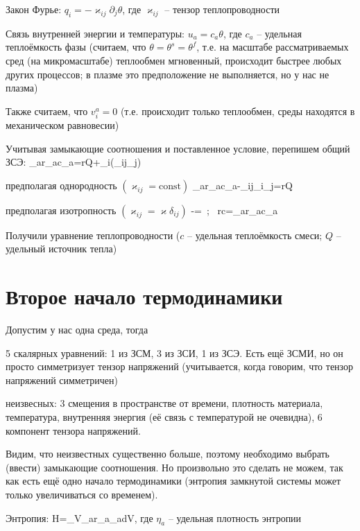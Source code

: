 \documentclass[main.tex]{subfiles}
\begin{document}
Закон Фурье: $q_i=-\varkappa_{ij}\partial_j\theta$, где $\varkappa_{ij}$ -- тензор теплопроводности

Связь внутренней энергии и температуры: $u_a=c_a\theta$, где $c_a$ -- удельная теплоёмкость фазы (считаем, что $\theta=\theta^s=\theta^f$, т.е. на масштабе рассматриваемых сред (на микромасштабе) теплообмен мгновенный, происходит быстрее любых других процессов; в плазме это предположение не выполняется, но у нас не плазма)

Также считаем, что $v_i^a=0$ (т.е. происходит только теплообмен, среды находятся в механическом равновесии)

Учитывая замыкающие соотношения и поставленное условие, перепишем общий ЗСЭ:
\beq\label{HT}
\sum\limits_{a}{r_ac_a}=rQ+\partial_i\left(\varkappa_{ij}\partial_j\theta\right)
\eeq

предполагая однородность $\left(\varkappa_{ij}=\text{const}\right)$
\beq\label{HeatTransfer}
\sum\limits_{a}{r_ac_a}-\varkappa_{ij}\partial_i\partial_j\theta=rQ
\eeq

предполагая изотропность $\left(\varkappa_{ij}=\varkappa\delta_{ij}\right)$
\beq
{}-\Delta\theta=\,\,\,;\,\,\, rc=\sum\limits_{a}{r_ac_a}
\eeq

Получили уравнение теплопроводности ($c$ -- удельная теплоёмкость смеси; $Q$ -- удельный источник тепла)

\newpage
\section{Второе начало термодинамики}

Допустим у нас одна среда, тогда

5 скалярных уравнений: 1 из ЗСМ, 3 из ЗСИ, 1 из ЗСЭ. Есть ещё ЗСМИ, но он просто симметризует тензор напряжений (учитывается, когда говорим, что тензор напряжений симметричен)

неизвесных: 3 смещения в пространстве от времени, плотность материала, температура, внутренняя энергия (её связь с температурой не очевидна), 6 компонент тензора напряжений.

Видим, что неизвестных существенно больше, поэтому необходимо выбрать (ввести) замыкающие соотношения. Но произвольно это сделать не можем, так как есть ещё одно начало термодинамики (энтропия замкнутой системы может только увеличиваться со временем).

Энтропия:
\beq
H=\iiint\limits_{V}{\sum\limits_{a}{r_a\eta_a}dV},
\eeq
где $\eta_a$ -- удельная плотность энтропии
\end{document}
